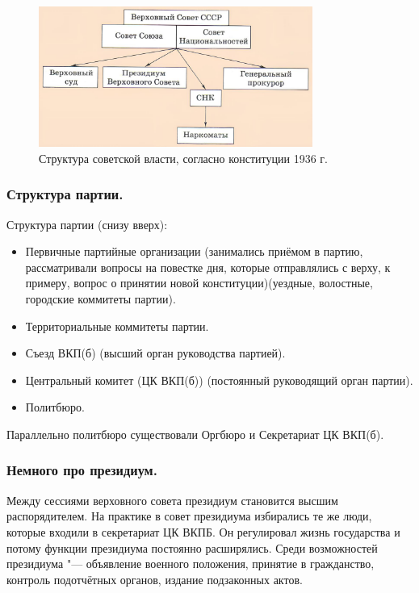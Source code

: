 \begin{figure}[H]
    \centering
    \includegraphics[width=0.8\textwidth]{картинки/Структура_советской_власти_1936.jpg}
    \caption{Структура советской власти, согласно конституции 1936 г.}
\end{figure}

\subsubsection{\textbf{Структура партии.}}

Структура партии (снизу вверх):

\begin{itemize}
    \item Первичные партийные организации (занимались приёмом в партию, рассматривали вопросы на повестке дня, которые отправлялись с верху, к примеру, вопрос о принятии новой конституции)(уездные, волостные, городские коммитеты партии).
    \item Территориальные коммитеты партии.
    \item Съезд ВКП(б) (высший орган руководства партией). 
    \item Центральный комитет (ЦК ВКП(б)) (постоянный руководящий орган партии).
    \item Политбюро.
\end{itemize}

Параллельно политбюро существовали Оргбюро и Секретариат ЦК ВКП(б).

\subsubsection{\textbf{Немного про президиум.}}

Между сессиями верховного совета президиум становится высшим распорядителем. На практике в совет президиума избирались те же люди, которые входили в секретариат ЦК ВКПБ. Он регулировал жизнь государства и потому функции президиума постоянно расширялись. Среди возможностей президиума "--- объявление военного положения, принятие в гражданство, контроль подотчётных органов, издание подзаконных актов.